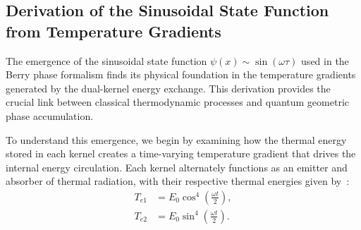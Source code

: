 \documentclass[%
 reprint,
 amsmath,amssymb,
 aps,
]{revtex4-1}
\numberwithin{equation}{section}%
\begin{document}
\subsection{Derivation of the Sinusoidal State Function from Temperature Gradients} \label{subsec:sinusoidal_derivation}

The emergence of the sinusoidal state function $\psi(x) \sim \sin(\omega \tau)$ used in the Berry phase formalism finds its physical foundation in the temperature gradients generated by the dual-kernel energy exchange. This derivation provides the crucial link between classical thermodynamic processes and quantum geometric phase accumulation.

To understand this emergence, we begin by examining how the thermal energy stored in each kernel creates a time-varying temperature gradient that drives the internal energy circulation. Each kernel alternately functions as an emitter and absorber of thermal radiation, with their respective thermal energies given by~\cite{hanamura1811.0312}:
\begin{align}
T_{e1} &= E_0 \cos^4\left(\frac{\omega t}{2}\right), \label{eq:kernel_A_energy}\\
T_{e2} &= E_0 \sin^4\left(\frac{\omega t}{2}\right). \label{eq:kernel_B_energy}
\end{align}
\end{document}
